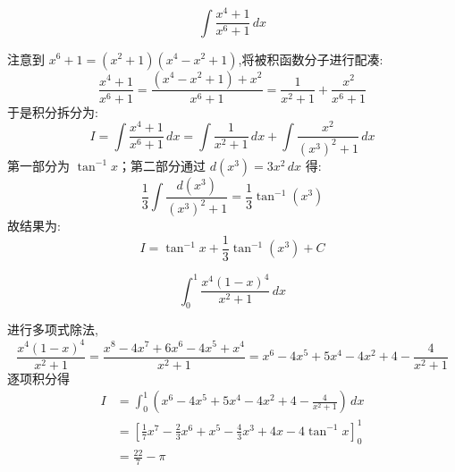 \begin{questions}
    \question 
    \[
    \int \frac{x^4+1}{x^6+1} \, dx
    \]
    \begin{solution}
        注意到 $x^6+1 = (x^2+1)(x^4-x^2+1)$,将被积函数分子进行配凑:
        \[
        \frac{x^4+1}{x^6+1} = \frac{(x^4-x^2+1) + x^2}{x^6+1} = \frac{1}{x^2+1} + \frac{x^2}{x^6+1}
        \]
        于是积分拆分为:
        \[
        I = \int \frac{x^4+1}{x^6+1} \, dx = \int \frac{1}{x^2+1} \, dx + \int \frac{x^2}{(x^3)^2+1} \, dx
        \]
        第一部分为 $\tan^{-1} x$；第二部分通过 $d(x^3) = 3x^2 \, dx$ 得:
        \[
        \frac{1}{3} \int \frac{d(x^3)}{(x^3)^2+1} = \frac{1}{3} \tan^{-1}(x^3)
        \]
        故结果为:
        \[
        I = \tan^{-1} x + \frac{1}{3} \tan^{-1}(x^3) + C
        \]
    \end{solution}

    \question
    \[
    \int_{0}^{1} \frac{x^4(1-x)^4}{x^2+1} \, dx
    \]
    \begin{solution}
        进行多项式除法,
        \[
        \frac{x^4(1-x)^4}{x^2+1}=\frac{x^8-4x^7+6x^6-4x^5+x^4}{x^2+1} = x^6 - 4x^5 + 5x^4 - 4x^2 + 4 - \frac{4}{x^2+1}
        \]
        逐项积分得
        \begin{align*}
        I &= \int_{0}^{1} \left( x^6 - 4x^5 + 5x^4 - 4x^2 + 4 - \frac{4}{x^2+1} \right) \, dx \\
        &= \left[ \frac{1}{7}x^7 - \frac{2}{3}x^6 + x^5 - \frac{4}{3}x^3 + 4x - 4\tan^{-1}x \right]_{0}^{1} \\
        &= \frac{22}{7} - \pi
        \end{align*}
    \end{solution}


\end{questions}
